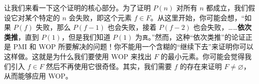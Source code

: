 让我们来看一下这个证明的核心部分。为了证明 $P(n)$ 对所有 $n$ 都成立，我们假设它对某个特定的 $n$ 会失败，即这个元素 $f \in F$。从这里开始，你可能会想，``如果 $P(f)$ 失败，那么 $P(f-1)$ 也会失败，接着 $P(f-2)$ 也会失败，……\textbf{依次类推}，直到 $P(1)$，但是我们知道 $P(1)$ 为\verb|真|。''然而，这种``依次类推''的论证正是 PMI 和 WOP 所要解决的问题！你不能用一个含糊的``继续下去''来证明你可以这样做。这就是为什么我们要使用 WOP 来找出 $F$ 的最小元素。你可能会觉得我们引入 $f \in F$ 然后不再使用它很奇怪。其实，我们需要 $f$ 的存在来证明 $F \ne \varnothing$，从而能够应用 WOP。
